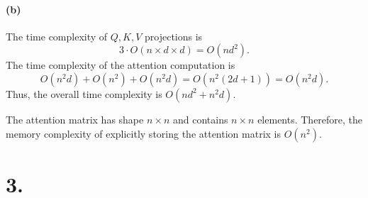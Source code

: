 \documentclass[11pt,a4paper]{article}
\begin{document}
\paragraph{(b)}
The time complexity of \(Q,K,V\) projections is
\[
3\cdot O(n\times d\times d)=O(nd^2).
\]
The time complexity of the attention computation is
\[
O(n^2d)+O(n^2)+O(n^2d)
=O\!\left(n^2(2d+1)\right)=O(n^2d).
\]
Thus, the overall time complexity is \(O(nd^2+n^2d)\).

The attention matrix has shape \(n\times n\) and contains \(n\times n\) elements.
Therefore, the memory complexity of explicitly storing the attention
matrix is \(O(n^2)\).

\clearpage
\section*{3.}
\begingroup
\small
\end{document}
